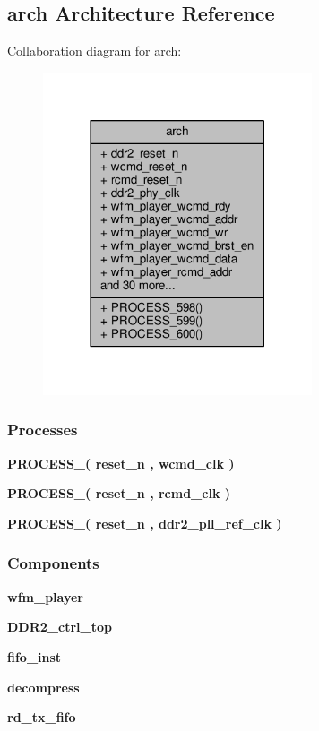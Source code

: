 \subsection{arch Architecture Reference}
\label{classwfm__player__top_1_1arch}


Collaboration diagram for arch\+:\nopagebreak
\begin{figure}[H]
\begin{center}
\leavevmode
\includegraphics[width=225pt]{d6/d2c/classwfm__player__top_1_1arch__coll__graph}
\end{center}
\end{figure}
\subsubsection*{Processes}
 \begin{DoxyCompactItemize}
\item 
{\bf P\+R\+O\+C\+E\+S\+S\+\_}{\bfseries  ( {\bfseries {\bfseries {\bf reset\+\_\+n}} \textcolor{vhdlchar}{ }} , {\bfseries {\bfseries {\bf wcmd\+\_\+clk}} \textcolor{vhdlchar}{ }} )}
\item 
{\bf P\+R\+O\+C\+E\+S\+S\+\_}{\bfseries  ( {\bfseries {\bfseries {\bf reset\+\_\+n}} \textcolor{vhdlchar}{ }} , {\bfseries {\bfseries {\bf rcmd\+\_\+clk}} \textcolor{vhdlchar}{ }} )}
\item 
{\bf P\+R\+O\+C\+E\+S\+S\+\_}{\bfseries  ( {\bfseries {\bfseries {\bf reset\+\_\+n}} \textcolor{vhdlchar}{ }} , {\bfseries {\bfseries {\bf ddr2\+\_\+pll\+\_\+ref\+\_\+clk}} \textcolor{vhdlchar}{ }} )}
\end{DoxyCompactItemize}
\subsubsection*{Components}
 \begin{DoxyCompactItemize}
\item 
{\bf wfm\+\_\+player}  {\bfseries }  
\item 
{\bf D\+D\+R2\+\_\+ctrl\+\_\+top}  {\bfseries }  
\item 
{\bf fifo\+\_\+inst}  {\bfseries }  
\item 
{\bf decompress}  {\bfseries }  
\item 
{\bf rd\+\_\+tx\+\_\+fifo}  {\bfseries }  
\end{DoxyCompactItemize}
